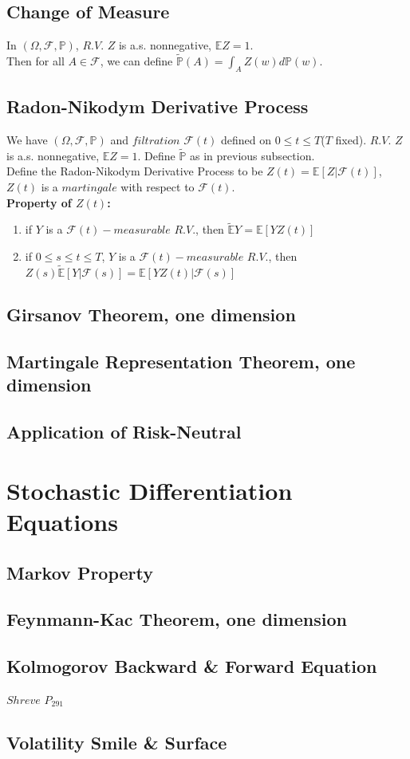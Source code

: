 \documentclass[a4paper, 12pt]{article}
\begin{document}
\subsection{Change of Measure}
In $(\Omega, \mathcal{F}, \mathbb{P})$, $R.V.$ $Z$ is a.s. nonnegative, $\mathbb{E}Z = 1$.\\
\indent Then for all $A \in \mathcal{F}$, we can define $\widetilde{\mathbb{P}}(A) = \int_A{Z(w)d\mathbb{P}(w)}$.

\subsection{Radon-Nikodym Derivative Process}
We have $(\Omega, \mathcal{F}, \mathbb{P})$ and $filtration$ $\mathcal{F}(t)$ defined on $0 \leq t \leq T$($T$ fixed). $R.V.$ $Z$ is a.s. nonnegative, $\mathbb{E}Z = 1$. Define $\widetilde{\mathbb{P}}$ as in previous subsection.\\
\indent Define the Radon-Nikodym Derivative Process to be $Z(t) = \mathbb{E}[Z|\mathcal{F}(t)]$, $Z(t)$ is a $martingale$ with respect to $\mathcal{F}(t)$.\\
\textbf{Property of $Z(t)$: }
\begin{enumerate}
	\item if $Y$ is a $\mathcal{F}(t)-measurable$ $R.V.$, then $\widetilde{\mathbb{E}}Y = \mathbb{E}[YZ(t)]$
	\item if $0 \leq s \leq t \leq T$, $Y$ is a $\mathcal{F}(t)-measurable$ $R.V.$, then \\$Z(s) \widetilde{\mathbb{E}}[Y|\mathcal{F}(s)] = \mathbb{E}[YZ(t)|\mathcal{F}(s)]$
\end{enumerate}

\subsection{Girsanov Theorem, one dimension}

\subsection{Martingale Representation Theorem, one dimension}

\subsection{Application of Risk-Neutral}

\section{Stochastic Differentiation Equations}

\subsection{Markov Property}

\subsection{Feynmann-Kac Theorem, one dimension}

\subsection{Kolmogorov Backward \& Forward Equation}
$Shreve$ $P_{291}$

\subsection{Volatility Smile \& Surface}
\end{document}
